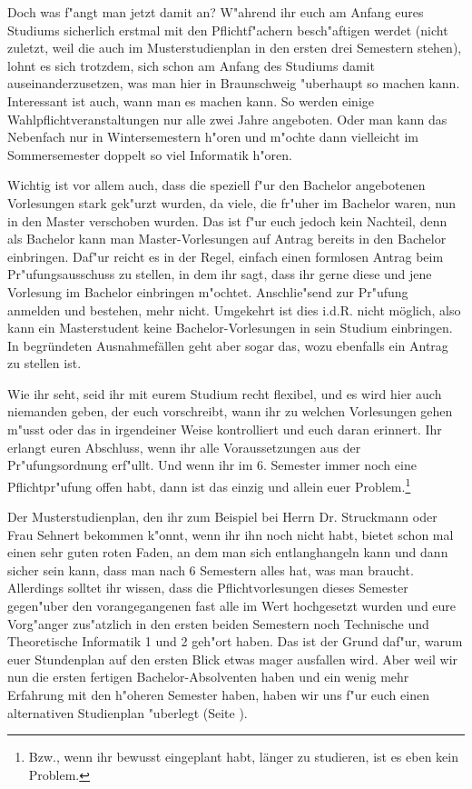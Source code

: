 Doch was f"angt man jetzt damit an? W"ahrend ihr euch am Anfang eures Studiums sicherlich
erstmal mit den Pflichtf"achern besch"aftigen werdet (nicht zuletzt, weil die auch im
Musterstudienplan in den ersten drei Semestern stehen), lohnt es sich trotzdem, sich schon am
Anfang des Studiums damit auseinanderzusetzen, was man hier in Braunschweig "uberhaupt so
machen kann. Interessant ist auch, wann man es machen kann. So werden einige
Wahlpflichtveranstaltungen nur alle zwei Jahre angeboten. Oder man kann das Nebenfach nur in
Wintersemestern h"oren und m"ochte dann vielleicht im Sommersemester doppelt so viel Informatik
h"oren.

Wichtig ist vor allem auch, dass die speziell f"ur den Bachelor angebotenen Vorlesungen stark
gek"urzt wurden, da viele, die fr"uher im Bachelor waren, nun in den Master verschoben wurden. Das
ist f"ur euch jedoch kein Nachteil, denn als Bachelor kann man Master-Vorlesungen auf Antrag
bereits in den Bachelor einbringen. Daf"ur reicht es in der Regel, einfach einen formlosen Antrag
beim Pr"ufungsausschuss zu stellen, in dem ihr sagt, dass ihr gerne diese und jene Vorlesung im
Bachelor einbringen m"ochtet. Anschlie"send zur Pr"ufung anmelden und bestehen, mehr nicht. 
Umgekehrt ist dies i.d.R. nicht möglich, also kann ein Masterstudent keine Bachelor-Vorlesungen in sein Studium einbringen. 
In begründeten Ausnahmefällen geht aber sogar das, wozu ebenfalls ein Antrag zu stellen ist.

Wie ihr seht, seid ihr mit eurem Studium recht flexibel, und es wird hier auch niemanden geben, der
euch vorschreibt, wann ihr zu welchen Vorlesungen gehen m"usst oder das in irgendeiner Weise
kontrolliert und euch daran erinnert. Ihr erlangt euren Abschluss, wenn ihr alle Voraussetzungen aus
der Pr"ufungsordnung erf"ullt. Und wenn ihr im 6. Semester immer noch eine Pflichtpr"ufung offen
habt, dann ist das einzig und allein euer Problem.\footnote{Bzw., wenn ihr bewusst eingeplant habt, länger zu studieren, ist es eben kein Problem.} 

Der Musterstudienplan, den ihr zum Beispiel bei Herrn Dr. Struckmann
oder Frau Sehnert bekommen k"onnt, wenn ihr
ihn noch nicht habt, bietet schon mal einen sehr guten roten Faden, an dem man sich entlanghangeln
kann und dann sicher sein kann, dass man nach 6 Semestern alles hat, was man braucht. Allerdings
solltet ihr wissen, dass die Pflichtvorlesungen dieses Semester gegen"uber den vorangegangenen fast
alle im Wert hochgesetzt wurden und eure Vorg"anger zus"atzlich in den ersten beiden Semestern
noch Technische und Theoretische Informatik 1 und 2 geh"ort haben. Das ist der Grund daf"ur,
warum euer Stundenplan auf den ersten Blick etwas mager ausfallen wird. Aber weil wir nun die
ersten fertigen Bachelor-Absolventen haben und ein wenig mehr Erfahrung mit den h"oheren
Semester haben, haben wir uns f"ur euch einen alternativen Studienplan
"uberlegt (Seite \pageref{studienplan_neu}).

